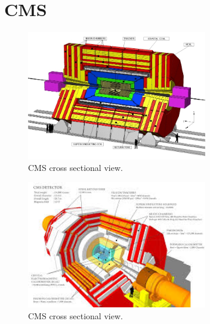 \section{CMS}

\begin{figure}[!h]
  \centering
  \includegraphics[width=0.7\textwidth]{../images/ch2/cms_layout}
  \caption[CMS cross sectional view]{CMS cross sectional view.}\label{fig:cms_layout}
\end{figure}

\begin{figure}[!h]
  \centering
  \includegraphics[width=0.7\textwidth]{../images/ch2/cms2}
  \caption[CMS cross sectional view]{CMS cross sectional view.}\label{fig:cms_layout}
\end{figure}


